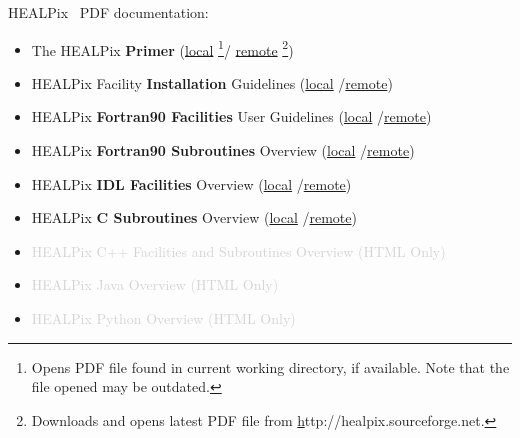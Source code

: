 \documentclass[12pt,twoside]{article}
\newcommand{\remoteloc}{http://healpix.sourceforge.net}
\newcommand{\linksfn}[1]{%
(\href{#1}{local}%
\footnote{Opens PDF file found in current working directory, if available. Note that the file opened may be outdated.}/%
\href{\remoteloc/pdf/#1}{remote}%
\footnote{Downloads and opens latest PDF file from \href{\remoteloc/documentation.php}\remoteloc.})}
\newcommand{\links}[1]{%
(\href{#1}{local}%
/\href{\remoteloc/pdf/#1}{remote})}
\begin{document}
\thispagestyle{empty}



{\Large HEALPix \hpxversion\ PDF documentation:}
\begin{itemize}
%
    \item {The HEALPix \textbf{Primer}} 				\linksfn{intro.pdf}
    \item {HEALPix Facility \textbf{Installation} Guidelines} 		\links{install.pdf}
    \item {HEALPix \textbf{Fortran90 Facilities} User Guidelines}	\links{facilities.pdf}
    \item {HEALPix \textbf{Fortran90 Subroutines} Overview}		\links{subroutines.pdf}
    \item {HEALPix \textbf{IDL Facilities} Overview}			\links{idl.pdf}
    \item {HEALPix \textbf{C Subroutines} Overview}			\links{csub.pdf}
%
    \item \textcolor{lightgray} {HEALPix C++ Facilities and Subroutines Overview (HTML Only)}
    \item \textcolor{lightgray} {HEALPix Java Overview (HTML Only)}
    \item \textcolor{lightgray} {HEALPix Python Overview (HTML Only)}
\end{itemize}
\end{document}
